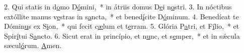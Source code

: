 2. Qui statis in d\uline{o}mo D\uline{ó}mini,~* in átriis domus D\uline{e}i n\uline{o}stri.
3. In nóctibus extóllite manus v\uline{e}stras in s\uline{a}ncta,~* et bened\uline{í}cite D\uline{ó}minum.
4. Benedícat te Dómin\uline{u}s ex S\uline{i}on,~* qui fecit c\uline{æ}lum et t\uline{e}rram.
5. Glória P\uline{a}tri, et F\uline{í}lio,~* et Spir\uline{í}tui S\uline{a}ncto.
6. Sicut erat in princípio, et n\uline{u}nc, et s\uline{e}mper,~* et in sǽcula sæcul\uline{ó}rum. \uline{A}men.
